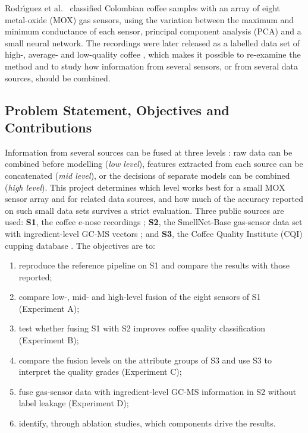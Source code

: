 Rodr\'{\i}guez et al.\ \cite{rodriguez2010electronic} classified Colombian coffee samples with an array of eight metal-oxide (MOX) gas sensors, using the variation between the maximum and minimum conductance of each sensor, principal component analysis (PCA) and a small neural network. The recordings were later released as a labelled data set of high-, average- and low-quality coffee \cite{rodriguezgamboa2020dataset}, which makes it possible to re-examine the method and to study how information from several sensors, or from several data sources, should be combined.

\subsection{Problem Statement, Objectives and Contributions}

Information from several sources can be fused at three levels \cite{hall1997introduction,borras2015data}: raw data can be combined before modelling (\emph{low level}), features extracted from each source can be concatenated (\emph{mid level}), or the decisions of separate models can be combined (\emph{high level}). This project determines which level works best for a small MOX sensor array and for related data sources, and how much of the accuracy reported on such small data sets survives a strict evaluation. Three public sources are used: \textbf{S1}, the coffee e-nose recordings \cite{rodriguezgamboa2020dataset}; \textbf{S2}, the SmellNet-Base gas-sensor data set with ingredient-level GC-MS vectors \cite{feng2026smellnet}; and \textbf{S3}, the Coffee Quality Institute (CQI) cupping database \cite{ledoux2018cqi}. The objectives are to:
\begin{enumerate}[label=O\arabic*.]
\item reproduce the reference pipeline \cite{rodriguez2010electronic} on S1 and compare the results with those reported;
\item compare low-, mid- and high-level fusion of the eight sensors of S1 (Experiment A);
\item test whether fusing S1 with S2 improves coffee quality classification (Experiment B);
\item compare the fusion levels on the attribute groups of S3 and use S3 to interpret the quality grades (Experiment C);
\item fuse gas-sensor data with ingredient-level GC-MS information in S2 without label leakage (Experiment D);
\item identify, through ablation studies, which components drive the results.
\end{enumerate}

